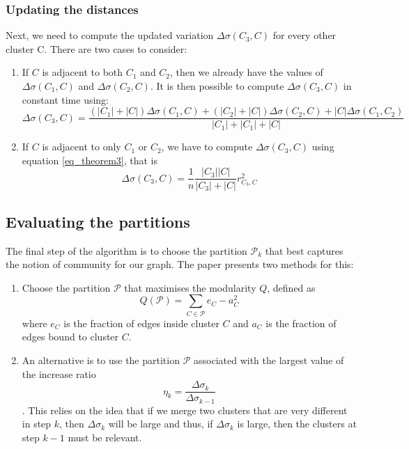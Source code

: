 \documentclass[12pt]{article}
\theoremstyle{definition}
\begin{document}
\subsubsection{Updating the distances}
Next, we need to compute the updated variation $\Delta\sigma(C_3, C)$ for every other cluster C. There are two cases to consider:
\begin{enumerate}
	\item If $C$ is adjacent to both $C_1$ and $C_2$, then we already have the values of $\Delta\sigma(C_1, C)$ and $\Delta\sigma(C_2, C)$. It is then possible to compute $\Delta\sigma(C_3, C)$ in constant time using:
	\begin{equation}
	\label{eq_theorem4}
	\Delta\sigma(C_3, C) = \frac{(|C_1| + |C|) \Delta\sigma(C_1,C) + (|C_2| + |C|) \Delta\sigma(C_2,C) + |C| \Delta\sigma(C_1,C_2)}{|C_1| + |C_1| + |C|}
	\end{equation}
	\item If $C$ is adjacent to only $C_1$ or $C_2$, we have to compute $\Delta\sigma(C_3, C)$ using equation \ref{eq_theorem3}, that is
	\begin{equation}
	\label{eq_theorem3}
	\Delta\sigma(C_3,C) = \frac{1}{n}\frac{|C_3||C|}{|C_3| + |C|} r_{C_3,C}^2 
	\end{equation}
\end{enumerate}

\subsection{Evaluating the partitions}
The final step of the algorithm is to choose the partition $\mathcal{P}_k$ that best captures the notion of community for our graph. The paper presents two methods for this:
\begin{enumerate}
	\item Choose the partition $\mathcal{P}$ that maximises the modularity $Q$, defined as
	\[ Q(\mathcal{P}) = \sum	_{C \in \mathcal{P}} e_C - a_C^2\] 
	where $e_C$ is the fraction of edges inside cluster $C$ and $a_C$ is the fraction of edges bound to cluster $C$.
	\item An alternative is to use the partition $\mathcal{P}$ associated with the largest value of the increase ratio
	\[ \eta_k = \frac{\Delta\sigma_k}{\Delta\sigma_{k-1}}\].
	This relies on the idea that if we merge two clusters that are very different in step $k$, then $\Delta\sigma_k$ will be large and thus, if $\Delta\sigma_k$ is large, then the clusters at step $k-1$ must be relevant.
\end{enumerate}
\end{document}
